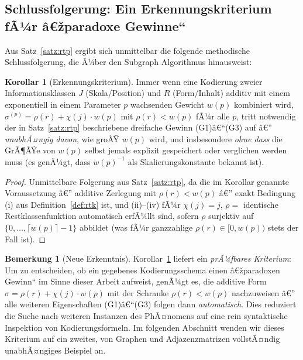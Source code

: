 ﻿\documentclass[a4paper,12pt]{article}
\theoremstyle{definition}
\newtheorem{bemerkung}{Bemerkung}
\newtheorem{korollar}{Korollar}
\begin{document}
\subsection{Schlussfolgerung: Ein Erkennungskriterium fÃ¼r â€žparadoxe Gewinne``}

Aus Satz~\ref{satz:rtp} ergibt sich unmittelbar die folgende methodische
Schlussfolgerung, die Ã¼ber den Subgraph Algorithmus hinausweist:

\begin{korollar}[Erkennungskriterium]
\label{kor:erkennung}
	Immer wenn eine Kodierung zweier Informationsklassen $J$ (Skala/Position)
	und $R$ (Form/Inhalt) additiv mit einem exponentiell in einem Parameter
	$p$ wachsenden Gewicht $w(p)$ kombiniert wird,
	$\sigma^{(p)} = \rho(r) + \chi(j)\cdot w(p)$ mit $\rho(r) < w(p)$ fÃ¼r alle
	$p$, tritt notwendig der in Satz~\ref{satz:rtp} beschriebene
	dreifache Gewinn (G1)â€“(G3) auf â€” \emph{unabhÃ¤ngig davon}, wie groÃŸ
	$w(p)$ wird, und insbesondere \emph{ohne dass} die GrÃ¶ÃŸe von $w(p)$
	selbst jemals explizit gespeichert oder verglichen werden muss
	(es genÃ¼gt, dass $w(p)^{-1}$ als Skalierungskonstante bekannt ist).
\end{korollar}

\begin{proof}
	Unmittelbare Folgerung aus Satz~\ref{satz:rtp}, da die im Korollar
	genannte Voraussetzung â€” additive Zerlegung mit $\rho(r)<w(p)$ â€” exakt
	Bedingung (i) aus Definition~\ref{def:rtk} ist, und (ii)--(iv) fÃ¼r
	$\chi(j)=j$, $\rho=$ identische Restklassenfunktion automatisch erfÃ¼llt
	sind, sofern $\rho$ surjektiv auf $\{0,\ldots,\lceil w(p)\rceil-1\}$
	abbildet (was fÃ¼r ganzzahlige $\rho(r)\in[0,w(p))$ stets der Fall ist).
\end{proof}

\begin{bemerkung}[Neue Erkenntnis]
	Korollar~\ref{kor:erkennung} liefert ein \emph{prÃ¼fbares Kriterium}: Um
	zu entscheiden, ob ein gegebenes Kodierungsschema einen â€žparadoxen
	Gewinn`` im Sinne dieser Arbeit aufweist, genÃ¼gt es, die additive Form
	$\sigma = \rho(r)+\chi(j)\cdot w(p)$ mit der Schranke $\rho(r)<w(p)$
	nachzuweisen â€” alle weiteren Eigenschaften (G1)â€“(G3) folgen dann
	\emph{automatisch}. Dies reduziert die Suche nach weiteren Instanzen des
	PhÃ¤nomens auf eine rein syntaktische Inspektion von Kodierungsformeln.
	Im folgenden Abschnitt wenden wir dieses Kriterium auf ein zweites,
	von Graphen und Adjazenzmatrizen vollstÃ¤ndig unabhÃ¤ngiges Beispiel an.
\end{bemerkung}
\end{document}
